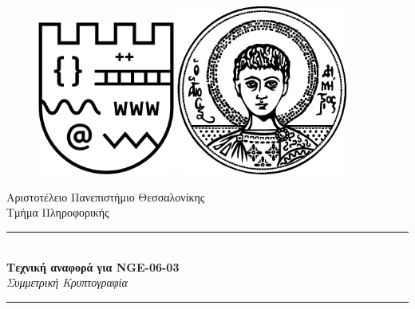 \documentclass[oneside]{article}
\newcommand{\Rule}{\rule{\linewidth}{0.5mm}}
\begin{document}
    
\begin{titlepage}

    \begin{figure}[!htb]
        \centering
        \begin{minipage}{0.45\textwidth}
            \centering
            \includegraphics[width=0.4\textwidth]{Images/logo_csd.png} %
        \end{minipage}\hfill
        \begin{minipage}{0.45\textwidth}
            \centering
            \includegraphics[width=0.5\textwidth]{Images/logo_auth.png} %
        \end{minipage}
    \end{figure}
     
    \begin{center}
        \LARGE{Αριστοτέλειο Πανεπιστήμιο Θεσσαλονίκης}
        \vspace{5mm}
        \\ \Large{Τμήμα Πληροφορικής}
    \end{center}
    
    \vspace*{\fill}
    
    \begin{center}
        \Rule \\[0.4cm]
        { \LARGE 
            \textbf{Τεχνική αναφορά για NGE-06-03}\\[0.4cm]
            \emph{Συμμετρική Κρυπτογραφία}\\[0.4cm]
        }
        \Rule \\[0.4cm]
    \end{center}
    

\end{titlepage}
\end{document}
